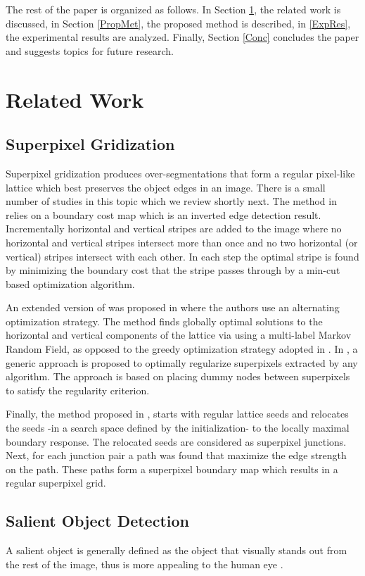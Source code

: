 \documentclass[a4paper,conference]{IEEEtran}
\begin{document}
The rest of the paper is organized as follows. In Section \ref{RelWork}, the related work is discussed, in Section \ref{PropMet}, the proposed method is described, in \ref{ExpRes}, the experimental results are analyzed. Finally, Section \ref{Conc} concludes the paper and suggests topics for future research.


\section{Related Work} \label{RelWork}
\subsection{Superpixel Gridization}
Superpixel gridization produces over-segmentations that form a regular pixel-like lattice which best preserves the object edges in an image.
There is a small number of studies in this topic which we review shortly next.
The method in \cite{Moore} relies on a boundary cost map which is an inverted edge detection result. Incrementally horizontal and vertical stripes are added to the image where no horizontal and vertical stripes intersect more than once and no two horizontal (or vertical) stripes intersect with each other. In each step the optimal stripe is found by minimizing the boundary cost that the stripe passes through by a min-cut based optimization algorithm.

An extended version of \cite{Moore} was proposed in \cite{Moore2} where the authors use an alternating optimization strategy. The method finds globally optimal solutions to the horizontal and vertical components of the lattice via using a multi-label Markov Random Field, as opposed to the greedy optimization strategy adopted in \cite{Moore}.
In \cite{Li1}, a generic approach is proposed to optimally regularize superpixels extracted by any algorithm. The approach is based on placing dummy nodes between superpixels to satisfy the regularity criterion.

Finally, the method proposed in \cite{Fu}, starts with regular lattice seeds and relocates the seeds -in a search space defined by the initialization- to the locally maximal boundary response. The relocated seeds are considered as superpixel junctions. Next, for each junction pair a path was found that maximize the edge strength on the path. These paths form a superpixel boundary map which results in a regular superpixel grid.   

\subsection{Salient Object Detection}
A salient object is generally defined as the object that visually stands out from the rest of the image, thus is more appealing to the human eye \cite{Borji1}. 
\end{document}

